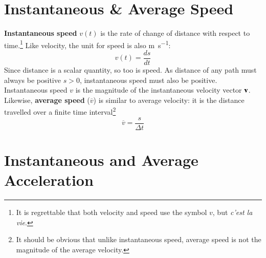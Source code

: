 \documentclass{../../oss-handout}
\newcommand{\mb}[1]{\ensuremath\mathbf{#1}}
\begin{document}
\section{Instantaneous \& Average Speed}

\textbf{Instantaneous speed} $v(t)$ is the rate of change of distance with
respect to time.\footnote{It is regrettable that both velocity and speed use
  the symbol $v$, but \emph{c'est la vie}.} Like velocity, the unit for
speed is also \si{\metre\per\second}:
\begin{equation*}
  \boxed{v(t)=\frac{ds}{dt}}
\end{equation*}
Since distance is a scalar quantity, so too is speed. As distance of any path
must always be positive $s>0$, instantaneous speed must also be positive.
Instantaneous speed $v$ is the magnitude of the instantaneous velocity vector
$\mb{v}$. Likewise, \textbf{average speed} ($\overline{v}$) is similar to
average velocity: it is the distance travelled over a finite time
interval\footnote{It should be obvious that unlike instantaneous speed, average
  speed is not the magnitude of the average velocity.}
\begin{equation*}
  \boxed{\overline{v}=\frac{s}{\Delta t}}
\end{equation*}



%


\section{Instantaneous and Average Acceleration}
\end{document}
